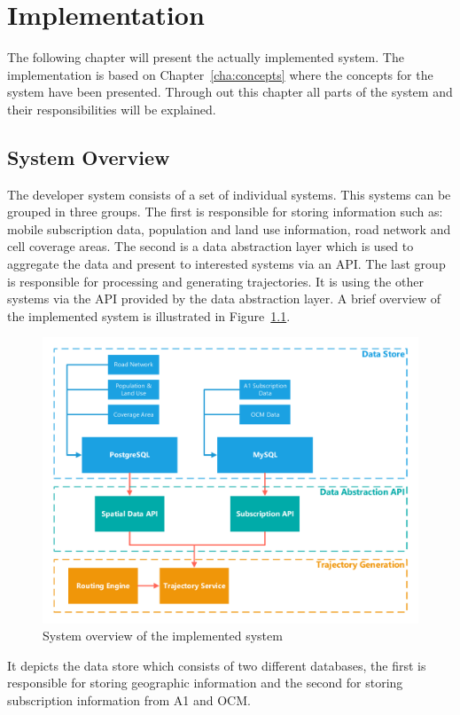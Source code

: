 
\chapter{Implementation}
\label{cha:implementation}
The following chapter will present the actually implemented system. The implementation is based on Chapter~\ref{cha:concepts} where the concepts for the system have been presented. Through out this chapter all parts of the system and their responsibilities will be explained.
\section{System Overview}
The developer system consists of a set of individual systems. This systems can be grouped in three groups. The first is responsible for storing information such as: mobile subscription data, population and land use information, road network and cell coverage areas. The second is a data abstraction layer which is used to aggregate the data and present to interested systems via an API. The last group is responsible for processing and generating trajectories. It is using the other systems via the API provided by the data abstraction layer. A brief overview of the implemented system is illustrated in Figure~\ref{fig:systemoverview}.
\begin{figure}
\centering
\includegraphics[width=\linewidth]{./images/systemoverview}
\caption{System overview of the implemented system}
\label{fig:systemoverview}
\end{figure}
It depicts the data store which consists of two different databases, the first is responsible for storing geographic information and the second for storing subscription information from A1 and OCM.
